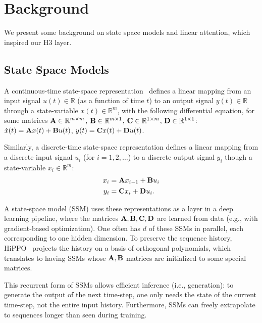 \section{Background}
\label{sec:background}

We present some background on state space models and linear attention, which inspired our H3 layer.

\subsection{State Space Models}

A continuous-time state-space representation~\citep{brogan1974modern} defines a linear mapping from an
input signal $u(t) \in \mathbb{R}$ (as a function of time $t$) to an output signal $y(t) \in \mathbb{R}$ through a state-variable
$x(t) \in \mathbb{R}^m$, with the following differential equation, for some matrices $\mathbf{A} \in \mathbb{R}^{m \times m}$, $\mathbf{B} \in \mathbb{R}^{m \times 1}$, $\mathbf{C} \in \mathbb{R}^{1 \times m}$,
$\mathbf{D} \in \mathbb{R}^{1 \times 1}$: $\dot{x}(t) = \mathbf{A} x(t) + \mathbf{B} u(t)$, $y(t) = \mathbf{C} x(t) + \mathbf{D} u(t)$.

Similarly, a discrete-time state-space representation defines a linear mapping
from a discrete input signal $u_i$ (for $i = 1, 2, \dots$) to a discrete output signal
$y_i$ though a state-variable $x_i \in \mathbb{R}^m$:
\begin{align*}
  x_i &= \mathbf{A} x_{i-1} + \mathbf{B} u_i \\
  y_i &= \mathbf{C} x_i + \mathbf{D} u_i.
\end{align*}

A state-space model (SSM) uses these representations as a layer in a deep learning
pipeline, where the matrices $\mathbf{A}, \mathbf{B}, \mathbf{C}, \mathbf{D}$ are learned from data (e.g.,
with gradient-based optimization).
One often has $d$ of these SSMs in parallel, each corresponding to one hidden
dimension.
To preserve the sequence history, HiPPO~\citep{gu2020hippo} projects the history
on a basis of orthogonal polynomials, which translates to having SSMs whose
$\mathbf{A}, \mathbf{B}$ matrices are initialized to some special matrices.

This recurrent form of SSMs allows efficient inference (i.e., generation): to
generate the output of the next time-step, one only needs the state of the
current time-step, not the entire input history.
Furthermore, SSMs can freely extrapolate to sequences longer than seen during training.

